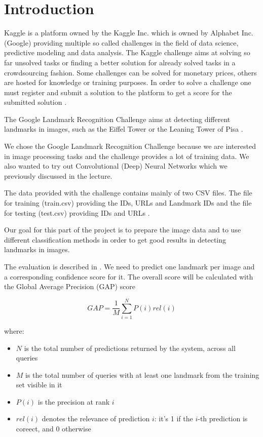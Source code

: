 \chapter{Introduction}

Kaggle is a platform owned by the Kaggle Inc. which is owned by Alphabet Inc. (Google) providing multiple so called challenges in the field of data science, predictive modeling and data analysis. The Kaggle challenge aims at solving so far unsolved tasks or finding a better solution for already solved tasks in a crowdsourcing fashion. Some challenges can be solved for monetary prices, others are hosted for knowledge or training purposes. In order to solve a challenge one must register and submit a solution to the platform to get a score for the submitted solution \cite{kaggle}.

The Google Landmark Recognition Challenge aims at detecting different landmarks in images, such as the Eiffel Tower or the Leaning Tower of Pisa \cite{challenge}.

We chose the Google Landmark Recognition Challenge because we are interested in image processing tasks and the challenge provides a lot of training data. We also wanted to try out Convolutional (Deep) Neural Networks which we previously discussed in the lecture.

The data provided with the challenge contains mainly of two CSV files. The file for training (train.csv) providing the IDs, URLs and Landmark IDs and the file for testing (test.csv) providing IDs and URLs \cite{data}.

Our goal for this part of the project is to prepare the image data and to use different classification methods in order to get good results in detecting landmarks in images.

The evaluation is described in \cite{evaluation}. We need to predict one landmark per image and a corresponding confidence score for it. The overall score will be calculated with the Global Average Precision (GAP) score

\[GAP = \frac{1}{M}\sum_{i=1}^{N}P(i)rel(i)\]

where:\\

\begin{itemize}
	\item $N$ is the total number of predictions returned by the system, across all queries
	\item $M$ is the total number of queries with at least one landmark from the training set visible in it
	\item $P(i)$ is the precision at rank $i$
	\item $rel(i)$ denotes the relevance of prediction $i$: it's 1 if the $i$-th prediction is coreect, and 0 otherwise
\end{itemize}

